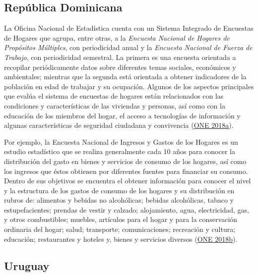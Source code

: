 \documentclass[
  12pt,
  spanish,
]{book}
\begin{document}
\hypertarget{repuxfablica-dominicana}{%
\subsection*{República Dominicana}\label{repuxfablica-dominicana}}

La Oficina Nacional de Estadística cuenta con un Sistema Integrado de Encuestas de Hogares que agrupa, entre otras, a la \emph{Encuesta Nacional de Hogares de Propósitos Múltiples}, con periodicidad anual y la \emph{Encuesta Nacional de Fuerza de Trabajo}, con periodicidad semestral. La primera es una encuesta orientada a recopilar periódicamente datos sobre diferentes temas sociales, económicos y ambientales; mientras que la segunda está orientada a obtener indicadores de la población en edad de trabajar y su ocupación. Algunos de los aspectos principales que evalúa el sistema de encuestas de hogares están relacionados con las condiciones y características de las viviendas y personas, así como con la educación de los miembros del hogar, el acceso a tecnologías de información y algunas características de seguridad ciudadana y convivencia (\protect\hyperlink{ref-ONE-DO}{ONE 2018a}).

Por ejemplo, la Encuesta Nacional de Ingresos y Gastos de los Hogares es un estudio estadístico que se realiza generalmente cada 10 años para conocer la distribución del gasto en bienes y servicios de consumo de los hogares, así como los ingresos que éstos obtienen por diferentes fuentes para financiar su consumo. Dentro de sus objetivos se encuentra el obtener información para conocer el nivel y la estructura de los gastos de consumo de los hogares y su distribución en rubros de: alimentos y bebidas no alcohólicas; bebidas alcohólicas, tabaco y estupefacientes; prendas de vestir y calzado; alojamiento, agua, electricidad, gas, y otros combustibles; muebles, artículos para el hogar y para la conservación ordinaria del hogar; salud; transporte; comunicaciones; recreación y cultura; educación; restaurantes y hoteles y, bienes y servicios diversos (\protect\hyperlink{ref-ONE2-DO}{ONE 2018b}).

\hypertarget{uruguay}{%
\subsection*{Uruguay}\label{uruguay}}
\end{document}

